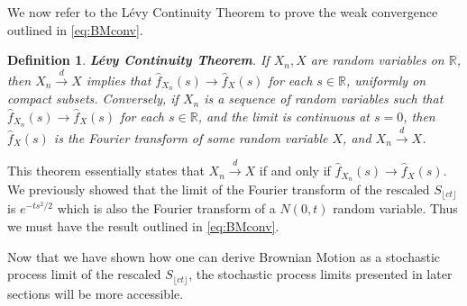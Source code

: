 \documentclass[honours,12pt]{unswthesis}
\newcommand{\R}{\mathbb{R}}
\newcommand{\1}{\mathbf 1}
\newtheorem{definition}[equation]{Definition}
\numberwithin{equation}{section}
\theoremstyle{definition}
\theoremstyle{remark}
\begin{document}
We now refer to the L\'{e}vy Continuity Theorem to prove the weak convergence outlined in \ref{eq:BMconv}.\\

\begin{definition}\cite{thebook}\label{def:levyContinuity}
	\textbf{L\'{e}vy Continuity Theorem}. If $X_n,X$ are random variables on $\R$, then $X_n\overset{d}{\longrightarrow}X$ implies that $\hat{f}_{X_n}(s)\to\hat{f}_X(s)$ for each $s\in \R$, uniformly on compact subsets. Conversely, if $X_n$ is a sequence of random variables such that $\hat{f}_{X_n}(s)\to\hat{f}_X(s)$ for each $s\in \R$, and the limit is continuous at $s=0$, then $\hat{f}_X(s)$ is the Fourier transform of some random variable $X$, and $X_n\overset{d}{\longrightarrow}X$.\\
\end{definition}
\noindent This theorem essentially states that $X_n\overset{d}{\longrightarrow}X$ if and only if $\hat{f}_{X_n}(s)\to\hat{f}_X(s)$. We previously showed that the limit of the Fourier transform of the rescaled $S_{\lfloor ct\rfloor}$ is $e^{-ts^2/2}$ which is also the Fourier transform of a $N(0,t)$ random variable. Thus we must have the result outlined in \ref{eq:BMconv}.




Now that we have shown how one can derive Brownian Motion as a stochastic process limit of the rescaled $S_{\lfloor ct\rfloor}$, the stochastic process limits presented in later sections will be more accessible.
\end{document}
